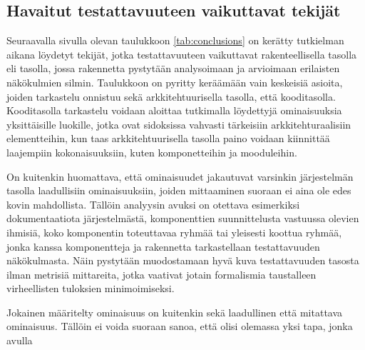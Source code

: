 \documentclass[finnish]{tktltiki2}
\numberwithin{table}{section}
\theoremstyle{definition}
\theoremstyle{remark}
\begin{document}



\subsection{Havaitut testattavuuteen vaikuttavat tekijät}

Seuraavalla sivulla olevan taulukkoon \ref{tab:conclusions} on kerätty tutkielman aikana löydetyt tekijät, jotka testattavuuteen vaikuttavat rakenteellisella tasolla eli tasolla, jossa rakennetta pystytään analysoimaan ja arvioimaan erilaisten näkökulmien silmin. Taulukkoon on pyritty keräämään vain keskeisiä asioita, joiden tarkastelu onnistuu sekä arkkitehtuurisella tasolla, että kooditasolla. Kooditasolla tarkastelu voidaan aloittaa tutkimalla löydettyjä ominaisuuksia yksittäisille luokille, jotka ovat sidoksissa vahvasti tärkeisiin arkkitehturaalisiin elementteihin, kun taas arkkitehtuurisella tasolla paino voidaan kiinnittää laajempiin kokonaisuuksiin, kuten komponetteihin ja mooduleihin.  

On kuitenkin huomattava, että ominaisuudet jakautuvat varsinkin järjestelmän tasolla laadullisiin ominaisuuksiin, joiden mittaaminen suoraan ei aina ole edes kovin mahdollista. Tällöin analyysin avuksi on otettava esimerkiksi dokumentaatiota järjestelmästä, komponenttien suunnittelusta vastuussa olevien ihmisiä, koko komponentin toteuttavaa ryhmää tai yleisesti koottua ryhmää, jonka kanssa komponentteja ja rakennetta tarkastellaan testattavuuden näkökulmasta. Näin pystytään muodostamaan hyvä kuva testattavuuden tasosta ilman metrisiä mittareita, jotka vaativat jotain formalismia taustalleen virheellisten tuloksien minimoimiseksi.

Jokainen määritelty ominaisuus on kuitenkin sekä laadullinen että mitattava ominaisuus. Tällöin ei voida suoraan sanoa, että olisi olemassa yksi tapa, jonka avulla 
\end{document}
